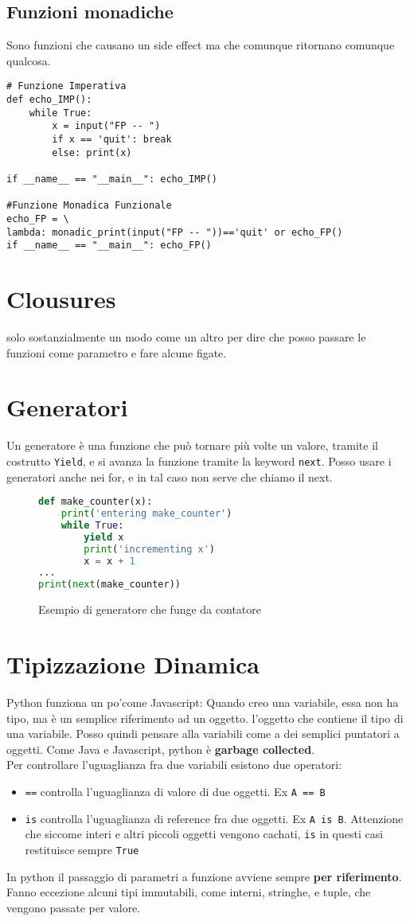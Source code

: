 \documentclass[a4paper,12pt]{article}
\begin{document}
\subsection{Funzioni monadiche}
Sono funzioni che causano un side effect ma che comunque ritornano comunque qualcosa.
\begin{lstlisting}
# Funzione Imperativa
def echo_IMP():
	while True:
		x = input("FP -- ")
		if x == 'quit': break
		else: print(x)
		
if __name__ == "__main__": echo_IMP()

#Funzione Monadica Funzionale
echo_FP = \
lambda: monadic_print(input("FP -- "))=='quit' or echo_FP()
if __name__ == "__main__": echo_FP()
\end{lstlisting}

\section{Clousures}
\E solo sostanzialmente un modo come un altro per dire che posso passare le funzioni come parametro e fare alcune figate.

\section{Generatori}
Un generatore è una funzione che può tornare più volte un valore, tramite il costrutto \texttt{Yield}, e si avanza la funzione tramite la keyword \texttt{next}. Posso usare i generatori anche nei for, e in tal caso non serve che chiamo il next.
\begin{figure}[H]
\begin{lstlisting}[language=python]
def make_counter(x):
	print('entering make_counter')
	while True:
		yield x
		print('incrementing x')
		x = x + 1
...
print(next(make_counter))
\end{lstlisting}
\caption{Esempio di generatore che funge da contatore}
\end{figure}

\section{Tipizzazione Dinamica}
Python funziona un po'come Javascript:
Quando creo una variabile, essa non ha tipo, ma è un semplice riferimento ad un oggetto. \E l'oggetto che contiene il tipo di una variabile. Posso quindi pensare alla variabili come a dei semplici puntatori a oggetti. Come Java e Javascript, python è \textbf{garbage collected}.\\
Per controllare l'uguaglianza fra due variabili esistono due operatori:
\begin{itemize}
\item \texttt{==} controlla l'uguaglianza di valore di due oggetti. Ex \texttt{A == B}
\item \texttt{is} controlla l'uguaglianza di reference fra due oggetti. Ex \texttt{A is B}. Attenzione che siccome interi e altri piccoli oggetti vengono cachati, \texttt{is} in questi casi restituisce sempre \texttt{True}
\end{itemize}

In python il passaggio di parametri a funzione avviene sempre \textbf{per riferimento}. Fanno eccezione alcuni tipi immutabili, come interni, stringhe, e tuple, che vengono passate per valore.
\end{document}
